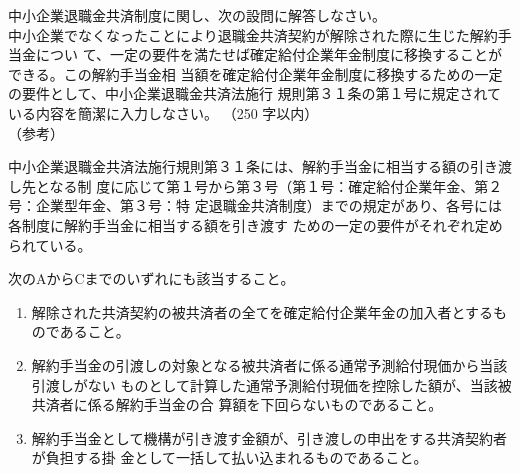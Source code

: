 \begin{shortanswer}[年金1 2025 問題2(4)]
  中小企業退職金共済制度に関し、次の設問に解答しなさい。 
\\

中小企業でなくなったことにより退職金共済契約が解除された際に生じた解約手当金につい
て、一定の要件を満たせば確定給付企業年金制度に移換することができる。この解約手当金相
当額を確定給付企業年金制度に移換するための一定の要件として、中小企業退職金共済法施行
規則第３１条の第１号に規定されている内容を簡潔に入力しなさい。 （250 字以内）
\\

（参考）

中小企業退職金共済法施行規則第３１条には、解約手当金に相当する額の引き渡し先となる制
度に応じて第１号から第３号（第１号：確定給付企業年金、第２号：企業型年金、第３号：特
定退職金共済制度）までの規定があり、各号には各制度に解約手当金に相当する額を引き渡す
ための一定の要件がそれぞれ定められている。
\end{shortanswer}

\begin{answerbox}
  次のAからCまでのいずれにも該当すること。

  \begin{enumerate}[A:]
    \item 解除された共済契約の被共済者の全てを確定給付企業年金の加入者とするものであること。
    \item 解約手当金の引渡しの対象となる被共済者に係る通常予測給付現価から当該引渡しがない
ものとして計算した通常予測給付現価を控除した額が、当該被共済者に係る解約手当金の合
算額を下回らないものであること。
\item 解約手当金として機構が引き渡す金額が、引き渡しの申出をする共済契約者が負担する掛
金として一括して払い込まれるものであること。
  \end{enumerate}

\end{answerbox}

\newpage